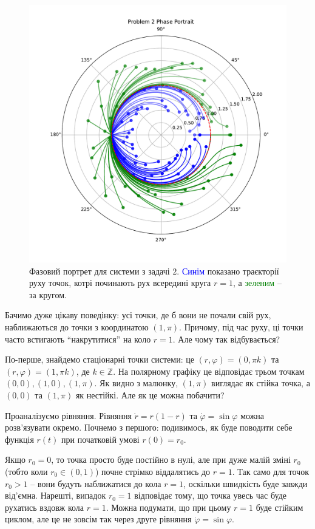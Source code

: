 \documentclass[oneside,solution]{tmpl}
\begin{document}
\begin{figure}
    \centering
    \includegraphics[width=\textwidth]{images/test/problem_2.pdf}
    \caption{Фазовий портрет для системи з задачі $2$. \textcolor{blue}{Синім} показано траєкторії руху точок, котрі починають рух всередині круга $r=1$, а \textcolor{green}{зеленим} -- за кругом.}
    \label{fig:problem_2}
\end{figure}

Бачимо дуже цікаву поведінку: усі точки, де б вони не почали свій рух, наближаються до точки з координатою $(1,\pi)$. Причому, під час руху, ці точки часто встигають ``накрутитися'' на коло $r=1$. Але чому так відбувається?

По-перше, знайдемо стаціонарні точки системи: це $(r,\varphi)=(0,\pi k)$ та $(r,\varphi)=(1,\pi k)$, де $k \in \mathbb{Z}$. На полярному графіку це відповідає трьом точкам $(0,0), (1,0), (1,\pi)$. Як видно з малюнку, $(1,\pi)$ виглядає як стійка точка, а $(0,0)$ та $(1,\pi)$ як нестійкі. Але як це можна побачити?

Проаналізуємо рівняння. Рівняння $\dot{r}=r(1-r)$ та $\dot{\varphi}=\sin\varphi$ можна розв'язувати окремо. Почнемо з першого: подивимось, як буде поводити себе функція $r(t)$ при початковій умові $r(0)=r_0$.

Якщо $r_0=0$, то точка просто буде постійно в нулі, але при дуже малій зміні $r_0$ (тобто коли $r_0 \in (0,1)$) почне стрімко віддалятись до $r=1$. Так само для точок $r_0>1$ -- вони будуть наближатися до кола $r=1$, оскільки швидкість буде завжди від'ємна. Нарешті, випадок $r_0=1$ відповідає тому, що точка увесь час буде рухатись вздовж кола $r=1$. Можна подумати, що при цьому $r=1$ буде стійким циклом, але це не зовсім так через друге рівняння $\dot{\varphi} = \sin \varphi$. 
\end{document}
